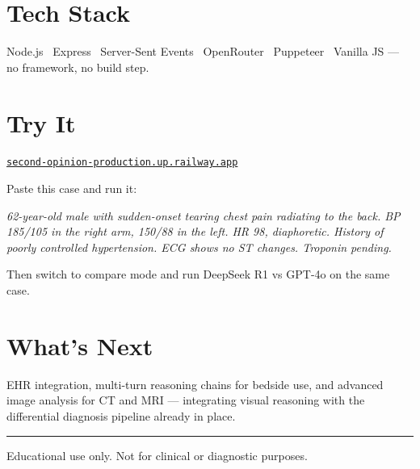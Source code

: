 \documentclass[11pt, a4paper]{article}
\begin{document}
\section{Tech Stack}

Node.js \textperiodcentered\ Express \textperiodcentered\ Server-Sent Events \textperiodcentered\ OpenRouter \textperiodcentered\ Puppeteer \textperiodcentered\ Vanilla JS — no framework, no build step.

\section{Try It}

\href{https://second-opinion-production.up.railway.app}{\texttt{second-opinion-production.up.railway.app}}

Paste this case and run it:

\begin{mdframed}[style=demobox]
\small\itshape
62-year-old male with sudden-onset tearing chest pain radiating to the back. BP 185/105 in the right arm, 150/88 in the left. HR 98, diaphoretic. History of poorly controlled hypertension. ECG shows no ST changes. Troponin pending.
\end{mdframed}

Then switch to compare mode and run DeepSeek R1 vs GPT-4o on the same case.

\section{What's Next}

EHR integration, multi-turn reasoning chains for bedside use, and advanced image analysis for CT and MRI — integrating visual reasoning with the differential diagnosis pipeline already in place.

\vspace{16pt}
{\color{borderlight}\rule{\linewidth}{0.5pt}}
\vspace{4pt}
{\small\color{textmuted} Educational use only. Not for clinical or diagnostic purposes.}
\end{document}
